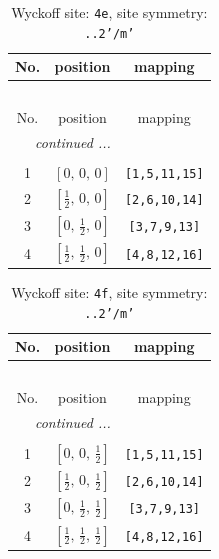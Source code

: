 \documentclass[fleqn,8pt]{jsarticle}
\begin{document}
\begin{longtable}{ccc}
\caption{Wyckoff site: {\tt 4e}, site symmetry: {\tt ..2'/m'}}
 \\
 \hline \hline
No. & position & mapping \\ \hline \endfirsthead

\multicolumn{2}{l}{\tablename\ \thetable{}} \\
 \hline \hline
No. & position & mapping \\ \hline \endhead

 \hline \hline
\multicolumn{2}{r}{\footnotesize\it continued ...} \\ \endfoot

 \hline \hline
\multicolumn{2}{r}{} \\ \endlastfoot

1 & $\left[ 0,\, 0,\, 0 \right]$ & {\tt [1,5,11,15]} \\ \hline
2 & $\left[ \frac{1}{2},\, 0,\, 0 \right]$ & {\tt [2,6,10,14]} \\ \hline
3 & $\left[ 0,\, \frac{1}{2},\, 0 \right]$ & {\tt [3,7,9,13]} \\ \hline
4 & $\left[ \frac{1}{2},\, \frac{1}{2},\, 0 \right]$ & {\tt [4,8,12,16]} \\
\end{longtable}
\renewcommand{\arraystretch}{1.2}
\begin{longtable}{ccc}
\caption{Wyckoff site: {\tt 4f}, site symmetry: {\tt ..2'/m'}}
 \\
 \hline \hline
No. & position & mapping \\ \hline \endfirsthead

\multicolumn{2}{l}{\tablename\ \thetable{}} \\
 \hline \hline
No. & position & mapping \\ \hline \endhead

 \hline \hline
\multicolumn{2}{r}{\footnotesize\it continued ...} \\ \endfoot

 \hline \hline
\multicolumn{2}{r}{} \\ \endlastfoot

1 & $\left[ 0,\, 0,\, \frac{1}{2} \right]$ & {\tt [1,5,11,15]} \\ \hline
2 & $\left[ \frac{1}{2},\, 0,\, \frac{1}{2} \right]$ & {\tt [2,6,10,14]} \\ \hline
3 & $\left[ 0,\, \frac{1}{2},\, \frac{1}{2} \right]$ & {\tt [3,7,9,13]} \\ \hline
4 & $\left[ \frac{1}{2},\, \frac{1}{2},\, \frac{1}{2} \right]$ & {\tt [4,8,12,16]} \\
\end{longtable}
\end{document}
